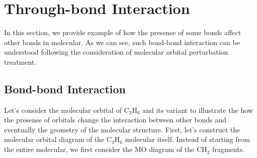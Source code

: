 \documentclass{article}
\begin{document}
\section{Through-bond Interaction}
In this section, we provide example of how the presense of some bonds 
affect other bonds in molecular. As we can see, such bond-bond interaction 
can be understood following the consideration of molecular orbital 
perturbation treatment. 

\subsection{Bond-bond Interaction}
Let's consider the molecular orbital of C$_3$H$_6$ and its variant to illustrate the 
how the presense of orbitals change the interaction between other bonds and eventually the 
geometry of the molecular structure. First, let's construct the molecular orbital diagram 
of the C$_3$H$_6$ molecular itself. Instead of starting from the entire molecular, we first 
consider the MO diagram of the CH$_2$ fragments.  
\end{document}
